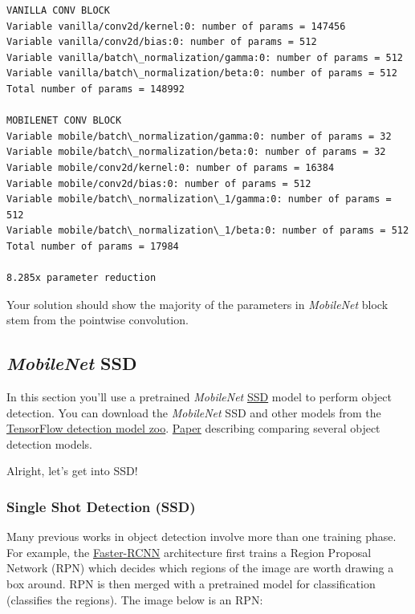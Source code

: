 \documentclass[11pt]{article}
\begin{document}
    \begin{Verbatim}[commandchars=\\\{\}]
VANILLA CONV BLOCK
Variable vanilla/conv2d/kernel:0: number of params = 147456
Variable vanilla/conv2d/bias:0: number of params = 512
Variable vanilla/batch\_normalization/gamma:0: number of params = 512
Variable vanilla/batch\_normalization/beta:0: number of params = 512
Total number of params = 148992

MOBILENET CONV BLOCK
Variable mobile/batch\_normalization/gamma:0: number of params = 32
Variable mobile/batch\_normalization/beta:0: number of params = 32
Variable mobile/conv2d/kernel:0: number of params = 16384
Variable mobile/conv2d/bias:0: number of params = 512
Variable mobile/batch\_normalization\_1/gamma:0: number of params = 512
Variable mobile/batch\_normalization\_1/beta:0: number of params = 512
Total number of params = 17984

8.285x parameter reduction

    \end{Verbatim}

    Your solution should show the majority of the parameters in
\emph{MobileNet} block stem from the pointwise convolution.

    \hypertarget{mobilenet-ssd}{%
\subsection{\texorpdfstring{\emph{MobileNet}
SSD}{MobileNet SSD}}\label{mobilenet-ssd}}

In this section you'll use a pretrained \emph{MobileNet}
\href{https://arxiv.org/abs/1512.02325}{SSD} model to perform object
detection. You can download the \emph{MobileNet} SSD and other models
from the
\href{https://github.com/tensorflow/models/blob/master/research/object_detection/g3doc/detection_model_zoo.md}{TensorFlow
detection model zoo}. \href{https://arxiv.org/abs/1611.10012}{Paper}
describing comparing several object detection models.

Alright, let's get into SSD!

    \hypertarget{single-shot-detection-ssd}{%
\subsubsection{Single Shot Detection
(SSD)}\label{single-shot-detection-ssd}}

Many previous works in object detection involve more than one training
phase. For example, the
\href{https://arxiv.org/abs/1506.01497}{Faster-RCNN} architecture first
trains a Region Proposal Network (RPN) which decides which regions of
the image are worth drawing a box around. RPN is then merged with a
pretrained model for classification (classifies the regions). The image
below is an RPN:
\end{document}
